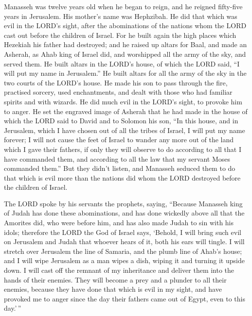  Manasseh was twelve years old when he began to reign, and
he reigned fifty-five years in Jerusalem. His mother's name was
Hephzibah.  He did that which was evil in the LORD's
sight, after the abominations of the nations whom the LORD cast out
before the children of Israel.  For he built again the
high places which Hezekiah his father had destroyed; and he raised up
altars for Baal, and made an Asherah, as Ahab king of Israel did, and
worshipped all the army of the sky, and served them.  He
built altars in the LORD's house, of which the LORD said, ``I will put
my name in Jerusalem.''  He built altars for all the army
of the sky in the two courts of the LORD's house.  He made
his son to pass through the fire, practised sorcery, used enchantments,
and dealt with those who had familiar spirits and with wizards. He did
much evil in the LORD's sight, to provoke him to anger. 
He set the engraved image of Asherah that he had made in the house of
which the LORD said to David and to Solomon his son, ``In this house,
and in Jerusalem, which I have chosen out of all the tribes of Israel, I
will put my name forever;  I will not cause the feet of
Israel to wander any more out of the land which I gave their fathers, if
only they will observe to do according to all that I have commanded
them, and according to all the law that my servant Moses commanded
them.''  But they didn't listen, and Manasseh seduced them
to do that which is evil more than the nations did whom the LORD
destroyed before the children of Israel.

 The LORD spoke by his servants the prophets, saying,
 ``Because Manasseh king of Judah has done these
abominations, and has done wickedly above all that the Amorites did, who
were before him, and has also made Judah to sin with his idols;
 therefore the LORD the God of Israel says, `Behold, I
will bring such evil on Jerusalem and Judah that whoever hears of it,
both his ears will tingle.  I will stretch over Jerusalem
the line of Samaria, and the plumb line of Ahab's house; and I will wipe
Jerusalem as a man wipes a dish, wiping it and turning it upside down.
 I will cast off the remnant of my inheritance and
deliver them into the hands of their enemies. They will become a prey
and a plunder to all their enemies,  because they have
done that which is evil in my sight, and have provoked me to anger since
the day their fathers came out of Egypt, even to this day.'\,''

